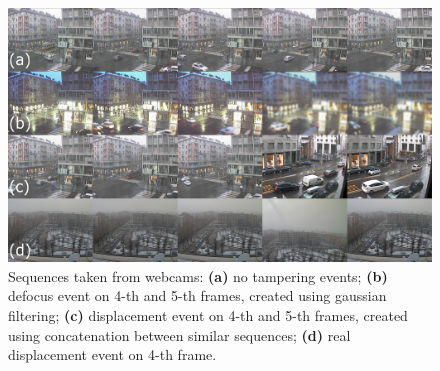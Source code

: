 \documentclass{llncs}
\begin{document}
\begin{figure}[t]
\centering
\includegraphics[width=1\linewidth]{Immagini/sequenze}
\caption{Sequences taken from webcams: \textbf{(a)} no tampering events; \textbf{(b)} defocus event on 4-th and 5-th frames, created using gaussian filtering; \textbf{(c)} displacement event on 4-th and 5-th frames, created using concatenation between similar sequences; \textbf{(d)} real displacement event on 4-th frame.}
\label{fig:sequences}
\end{figure}



% 
%
%
%
\end{document}
